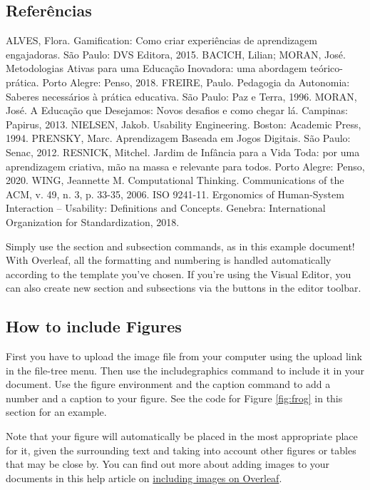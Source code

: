 \documentclass{article}
\begin{document}
\subsection{Referências}
ALVES, Flora. Gamification: Como criar experiências de aprendizagem engajadoras. São Paulo: DVS Editora, 2015.
BACICH, Lilian; MORAN, José. Metodologias Ativas para uma Educação Inovadora: uma abordagem teórico-prática. Porto Alegre: Penso, 2018.
FREIRE, Paulo. Pedagogia da Autonomia: Saberes necessários à prática educativa. São Paulo: Paz e Terra, 1996.
MORAN, José. A Educação que Desejamos: Novos desafios e como chegar lá. Campinas: Papirus, 2013.
NIELSEN, Jakob. Usability Engineering. Boston: Academic Press, 1994.
PRENSKY, Marc. Aprendizagem Baseada em Jogos Digitais. São Paulo: Senac, 2012.
RESNICK, Mitchel. Jardim de Infância para a Vida Toda: por uma aprendizagem criativa, mão na massa e relevante para todos. Porto Alegre: Penso, 2020.
WING, Jeannette M. Computational Thinking. Communications of the ACM, v. 49, n. 3, p. 33-35, 2006.
ISO 9241-11. Ergonomics of Human-System Interaction – Usability: Definitions and Concepts. Genebra: International Organization for Standardization, 2018.

Simply use the section and subsection commands, as in this example document! With Overleaf, all the formatting and numbering is handled automatically according to the template you've chosen. If you're using the Visual Editor, you can also create new section and subsections via the buttons in the editor toolbar.

\subsection{How to include Figures}

First you have to upload the image file from your computer using the upload link in the file-tree menu. Then use the includegraphics command to include it in your document. Use the figure environment and the caption command to add a number and a caption to your figure. See the code for Figure \ref{fig:frog} in this section for an example.

Note that your figure will automatically be placed in the most appropriate place for it, given the surrounding text and taking into account other figures or tables that may be close by. You can find out more about adding images to your documents in this help article on \href{https://www.overleaf.com/learn/how-to/Including_images_on_Overleaf}{including images on Overleaf}.
\end{document}
